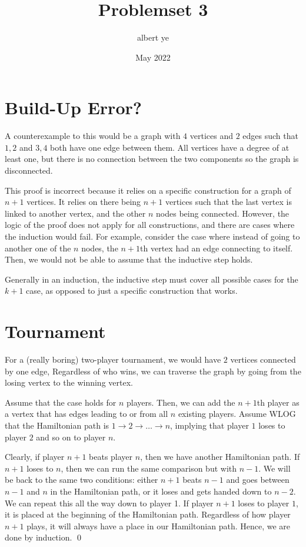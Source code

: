 \documentclass{article}
\title{Problemset 3}
\author{albert ye}
\date{May 2022}
\begin{document}
	\maketitle
	\section{Build-Up Error?}
	A counterexample to this would be a graph with $4$ vertices and $2$ edges 
	such that $1, 2$ and $3, 4$ both have one edge between them. All vertices 
	have a degree of at least one, but there is no connection between the 
	two components so the graph is disconnected.

	This proof is incorrect because it relies on a specific construction for 
	a graph of $n+1$ vertices. It relies on there being $n+1$ vertices such that 
	the last vertex is linked to another vertex, and the other $n$ nodes being connected.
	However, the logic of the proof does not apply for all constructions, and there are 
	cases where the induction would fail. For example, consider the case where instead of
	going to another one of the $n$ nodes, the $n+1$th vertex had an edge 
	connecting to itself. Then, we would not be able to assume that the inductive step holds. 

	Generally in an induction, the inductive step must cover all possible cases for 
	the $k+1$ case, as opposed to just a specific construction that works.

	\section{Tournament}
	For a (really boring) two-player tournament, we would have $2$ vertices connected by 
	one edge, Regardless of who wins, we can traverse the graph by going from the losing vertex 
	to the winning vertex.

	Assume that the case holds for $n$ players. Then, we can add the $n+1$th player as a vertex 
	that has edges leading to or from all $n$ existing players. Assume WLOG that the Hamiltonian path 
	is $1 \to 2 \to \ldots \to n$, implying that player $1$ loses to player $2$ and so on to player $n$.

	Clearly, if player $n+1$ beats player $n$, then we have another Hamiltonian path. If $n+1$ loses
	to $n$, then we can run the same comparison but with $n-1$. We will be back to the same two conditions:
	either $n+1$ beats $n-1$ and goes between $n-1$ and $n$ in the Hamiltonian path, or it loses and 
	gets handed down to $n-2$. We can repeat this all the way down to player 1. If player $n+1$ loses to 
	player $1$, it is placed at the beginning of the Hamiltonian path. Regardless of how player $n+1$ plays,
	it will always have a place in our Hamiltonian path. Hence, we are done by induction. \qed
\end{document}

